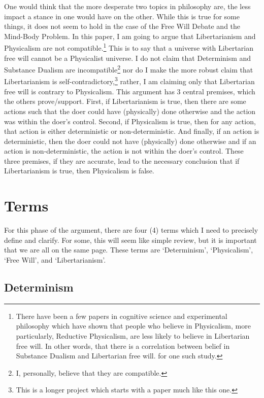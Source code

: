 One would think that the more desperate two topics in philosophy are, the less impact a stance in one would have on the other. While this is true for some things, it does not seem to hold in the case of the Free Will Debate and the Mind-Body Problem. In this paper, I am going to argue that Libertarianism and Physicalism are not compatible.\footnote{There have been a few papers in cognitive science and experimental philosophy which have shown that people who believe in Physicalism, more particularly, Reductive Physicalism, are less likely to believe in Libertarian free will. In other words, that there is a correlation between belief in Substance Dualism and Libertarian free will. \cite{Wisniewski1} for one such study.} This is to say that a universe with Libertarian free will cannot be a Physicalist universe. I do not claim that Determinism and Substance Dualism are incompatible\footnote{I, personally, believe that they are compatible.} nor do I make the more robust claim that Libertarianism is self-contradictory,\footnote{This is a longer project which starts with a paper much like this one.} rather, I am claiming only that Libertarian free will is contrary to Physicalism. This argument has 3 central premises, which the others prove/support. First, if Libertarianism is true, then there are some actions such that the doer could have (physically) done otherwise and the action was within the doer's control. Second, if Physicalism is true, then for any action, that action is either deterministic or non-deterministic. And finally, if an action is deterministic, then the doer could not have (physically) done otherwise and if an action is non-deterministic, the action is not within the doer’s control. These three premises, if they are accurate, lead to the necessary conclusion that if Libertarianism is true, then Physicalism is false.
\section{Terms}

For this phase of the argument, there are four (4) terms which I need to precisely define and clarify. For some, this will seem like simple review, but it is important that we are all on the same page. These terms are ‘Determinism', ‘Physicalism', ‘Free Will', and ‘Libertarianism'.
\subsection{Determinism}

